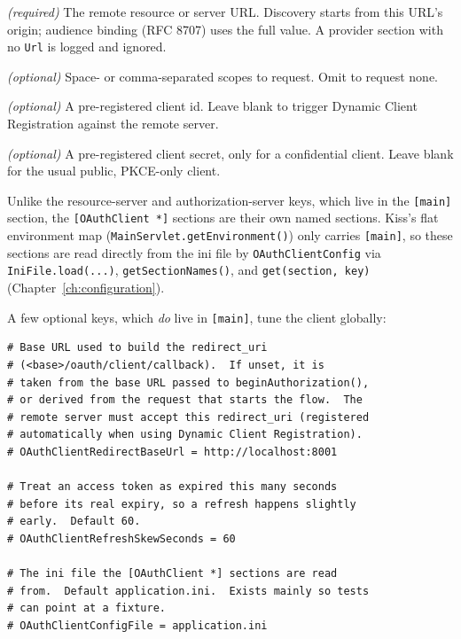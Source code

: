 \begin{description}[style=nextline]
  \item[\texttt{Url}] \emph{(required)}  The remote resource or server URL.  Discovery starts from this URL's origin; audience binding (RFC 8707) uses the full value.  A provider section with no \texttt{Url} is logged and ignored.
  \item[\texttt{Scopes}] \emph{(optional)}  Space- or comma-separated scopes to request.  Omit to request none.
  \item[\texttt{ClientId}] \emph{(optional)}  A pre-registered client id.  Leave blank to trigger Dynamic Client Registration against the remote server.
  \item[\texttt{ClientSecret}] \emph{(optional)}  A pre-registered client secret, only for a confidential client.  Leave blank for the usual public, PKCE-only client.
\end{description}

\begin{warnbox}
Unlike the resource-server and authorization-server keys, which live in the \texttt{[main]} section, the \texttt{[OAuthClient *]} sections are their own named sections.  Kiss's flat environment map (\texttt{MainServlet.getEnvironment()}) only carries \texttt{[main]}, so these sections are read directly from the ini file by \texttt{OAuthClientConfig} via \texttt{IniFile.load(...)}, \texttt{getSectionNames()}, and \texttt{get(section, key)} (Chapter~\ref{ch:configuration}).
\end{warnbox}

A few optional keys, which \emph{do} live in \texttt{[main]}, tune the client globally:

\begin{lstlisting}[style=ini]
# Base URL used to build the redirect_uri
# (<base>/oauth/client/callback).  If unset, it is
# taken from the base URL passed to beginAuthorization(),
# or derived from the request that starts the flow.  The
# remote server must accept this redirect_uri (registered
# automatically when using Dynamic Client Registration).
# OAuthClientRedirectBaseUrl = http://localhost:8001

# Treat an access token as expired this many seconds
# before its real expiry, so a refresh happens slightly
# early.  Default 60.
# OAuthClientRefreshSkewSeconds = 60

# The ini file the [OAuthClient *] sections are read
# from.  Default application.ini.  Exists mainly so tests
# can point at a fixture.
# OAuthClientConfigFile = application.ini
\end{lstlisting}

